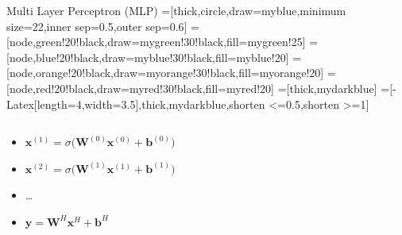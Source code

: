 \documentclass[pressentation,10pt,aspectratio=169,xcolor=table, colorlinks=true]{beamer}
\begin{document}
\begin{frame}[fragile]{Multi Layer Perceptron (MLP)}
  \tikzset{>=latex} %
  =[thick,circle,draw=myblue,minimum size=22,inner sep=0.5,outer sep=0.6]
  =[node,green!20!black,draw=mygreen!30!black,fill=mygreen!25]
  =[node,blue!20!black,draw=myblue!30!black,fill=myblue!20]
  =[node,orange!20!black,draw=myorange!30!black,fill=myorange!20]
  =[node,red!20!black,draw=myred!30!black,fill=myred!20]
  =[thick,mydarkblue] %
  =[-{Latex[length=4,width=3.5]},thick,mydarkblue,shorten <=0.5,shorten >=1]


  \begin{columns}
    \begin{column}{0.5\linewidth}
      \begin{itemize}
      \item \(\mathbf{x}^{(1)} = \sigma\Big(\mathbf{W}^{(0)}\mathbf{x}^{(0)}+\mathbf{b}^{(0)}\Big)\)
      \item \(\mathbf{x}^{(2)} = \sigma\Big(\mathbf{W}^{(1)}\mathbf{x}^{(1)}+\mathbf{b}^{(1)}\Big)\)
      \item \ldots
      \item \(\mathbf{y} = \mathbf{W}^{H}\mathbf{x}^{H}+\mathbf{b}^{H}\)
      \end{itemize}

    \end{column}
    

\end{columns}
\end{frame}
\end{document}
